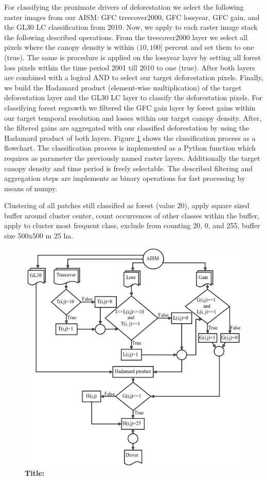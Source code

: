 			For classifying the proximate drivers of deforestation we select the following raster images from our \ac{AISM}: \ac{GFC} treecover2000, \ac{GFC} lossyear, \ac{GFC} gain, and the \ac{GL30} \ac{LC} classification from 2010. Now, we apply to each raster image stack the following described operations. From the treecover2000 layer we select all pixels where the canopy density is within $(10,100]$ percent and set them to one (true). The same is procedure is applied on the lossyear layer by setting all forest loss pixels within the time period 2001 till 2010 to one (true). After both layers are combined with a logical AND to select our target deforestation pixels. Finally, we build the Hadamard product (element-wise multiplication) of the target deforestation layer and the \ac{GL30} \ac{LC} layer to classify the deforestation pixels. For classifying forest regrowth we filtered the \ac{GFC} gain layer by forest gains within our target temporal resolution and losses within our target canopy density. After, the filtered gains are aggregated with our classified deforestation by using the Hadamard product of both layers. Figure \ref{fig:driver_flowchart} shows the classification process as a flowchart. The classification process is implemented as a Python function which requires as parameter the previously named raster layers. Additionally the target canopy density and time period is freely selectable. The described filtering and aggregation steps are implements as binary operations for fast processing by means of numpy.

			Clustering of all patches still classified as forest (value 20), apply square sized buffer around cluster center, count occurrences of other classes within the buffer, apply to cluster most frequent class, exclude from counting 20, 0, and 255, buffer size 500x500 m 25 ha.
			\begin{figure}[ht]
				\centering
				\includegraphics[scale=0.5]{img/driver_flowchart}
				\caption[]{\textbf{Title:}}
				\label{fig:driver_flowchart}
			\end{figure}

